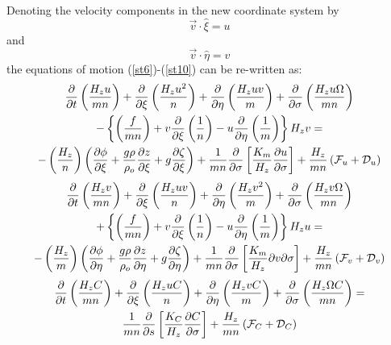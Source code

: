 Denoting the velocity components in the new coordinate system by
\begin{equation}
   \vec{v} \cdot \hat{\xi} = u
\end{equation}
and
\begin{equation}
   \vec{v} \cdot \hat{\eta} = v
\end{equation}
the equations of motion (\ref{st6})-(\ref{st10}) can be re-written
\citep[see, e.g.,][]{AL} as:
{\samepage
\begin{multline}
   \frac{\partial}{\partial t} \left( \frac{H_z u}{mn} \right) + \frac
   {\partial}{\partial \xi} \left( \frac{H_z u^2}{n} \right ) + \frac
   {\partial}{\partial \eta} \left( \frac{H_z uv}{m} \right) + \frac
   {\partial}{\partial \sigma} \left( \frac{H_z u\Omega}{mn} \right)
\\
   - \left\{\left(\frac{f}{mn} \right) + v \frac{\partial}{\partial \xi}
   \left( \frac{1}{n} \right) - u \frac{\partial}{\partial \eta} \left(
   \frac{1}{m} \right) \right\} H_z v =
\\
   -\left( \frac{H_z }{n} \right )
   \left( \frac{\partial \phi}{\partial \xi} +
   \frac{g \rho}{\rho_o} \frac{\partial z}{\partial \xi} +
   g \frac{\partial \zeta}{\partial \xi} \right) +
   \frac{ 1}{mn} \frac{\partial}{\partial \sigma}
   \left[ \frac{K_m}{H_z} \frac{\partial u}{\partial \sigma} \right] +
   \frac{ H_z}{mn}
   \left( {\cal F}_u + {\cal D}_u \right)
\label{st13}
\end{multline}
}
{\samepage
\begin{multline}
   \frac{\partial}{\partial t} \left( \frac{H_z v}{mn} \right) + \frac
   {\partial}{\partial \xi} \left( \frac{H_z uv}{n} \right ) + \frac
   {\partial}{\partial \eta} \left( \frac{H_z v^2}{m} \right) + \frac
   {\partial}{\partial \sigma} \left( \frac{H_z v\Omega}{mn} \right)
\\
   + \left\{\left(\frac{f}{mn} \right) + v \frac{\partial}{\partial \xi}
   \left( \frac{1}{n} \right) - u \frac{\partial}{\partial \eta} \left(
   \frac{1}{m} \right) \right\} H_z u =
\\
   -\left( \frac{H_z }{m} \right )
   \left( \frac{\partial \phi}{\partial \eta} +
   \frac{g \rho}{\rho_o} \frac{\partial z}{\partial \eta} +
   g \frac{\partial \zeta}{\partial \eta} \right) +
   \frac{ 1}{mn} \frac{\partial}{\partial \sigma}
   \left[ \frac{K_m}{H_z} {\partial v}{\partial \sigma} \right] +
   \frac{ H_z}{mn}
   \left( {\cal F}_v + {\cal D}_v \right)
\label{st14}
\end{multline}
}
\begin{multline}
   \frac{\partial}{\partial t} \left( \frac{H_z C}{mn} \right) +
   \frac {\partial}{\partial \xi} \left( \frac{H_z uC}{n} \right ) +
   \frac {\partial}{\partial \eta} \left( \frac{H_z vC}{m} \right) +
   \frac {\partial}{\partial \sigma}
   \left( \frac{H_z \Omega C}{mn} \right) =
\\
   \frac{ 1}{mn} \frac{\partial}{\partial s}
   \left[ \frac{K_C}{H_z} \frac{\partial C}{\partial \sigma} \right] +
   \frac{ H_z}{mn}
   \left( {\cal F}_{C} + {\cal D}_{C} \right)
\label{st15}
\end{multline}
